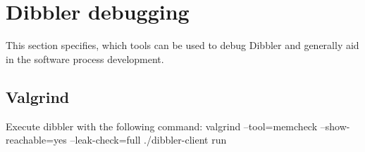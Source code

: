 \section{Dibbler debugging}

This section specifies, which tools can be used to debug Dibbler and
generally aid in the software process development.

\subsection{Valgrind}

Execute dibbler with the following command:
valgrind --tool=memcheck --show-reachable=yes --leak-check=full ./dibbler-client run
